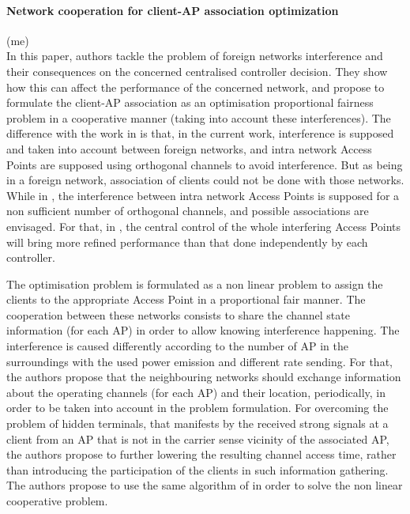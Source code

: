 \documentclass[journal,transmag]{IEEEtran}
\begin{document}
\paragraph{Network cooperation for client-AP association optimization \cite{12Network_cooperation_AP_association}} (me)\\ 
In this paper, authors tackle the problem of foreign networks interference and their consequences on the concerned centralised controller decision. They show how this can affect the performance of the concerned network, and propose to formulate the client-AP association as an optimisation proportional fairness problem in a cooperative manner (taking into account these interferences).   
The difference with the work in \cite{14optimalAP_INFOCOM} is that, in the current work, interference is supposed and taken into account between foreign networks, and intra network Access Points are supposed using orthogonal channels to avoid interference. But as being in a foreign network, association of clients could not be done with those networks. While in \cite{14optimalAP_INFOCOM}, the interference between intra network Access Points is supposed for a non sufficient number of orthogonal channels, and possible associations are envisaged. For that, in \cite{14optimalAP_INFOCOM}, the central control of the whole interfering Access Points will bring more refined performance than that done independently by each controller.  

The optimisation problem is formulated as a non linear problem to assign the clients to the appropriate Access Point in a proportional fair manner. The cooperation between these networks consists to share the channel state information (for each AP) in order to allow knowing interference happening.     
The interference is caused differently according to the number of AP in the surroundings with the used power emission and different rate sending. For that, the authors propose that the neighbouring networks should exchange information about the operating channels (for each AP) and their location, periodically, in order to be taken into account in the problem formulation. For overcoming the problem of hidden terminals, that manifests by the received strong signals at a client from an AP that is not in the carrier sense vicinity of the associated AP, the authors propose to further lowering the resulting channel access time, rather than introducing the participation of the clients in such information gathering. The authors propose to use the same algorithm of \cite{08proportional_fairness_multiRate_LAN} in order to solve the non linear cooperative problem.
\end{document}
